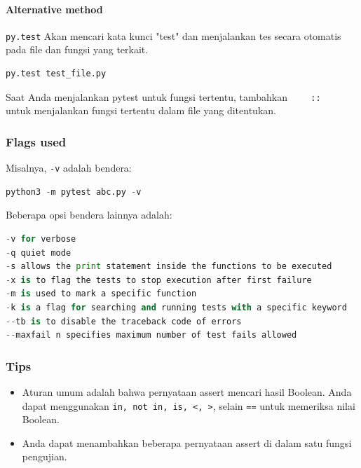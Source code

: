 \documentclass{article}
\begin{document}
\paragraph{Alternative method}

\verb|py.test| Akan mencari kata kunci "test" dan menjalankan tes secara otomatis pada file dan fungsi yang terkait.
\begin{lstlisting}[language=Python, caption={}, captionpos=b]
    py.test test_file.py
\end{lstlisting}

Saat Anda menjalankan pytest untuk fungsi tertentu, tambahkan \verb|    ::   | untuk menjalankan fungsi tertentu dalam file yang ditentukan.

\subsubsection{Flags used}
Misalnya, \verb|-v| adalah bendera:
\begin{lstlisting}[language=Python, caption={}, captionpos=b]
    python3 -m pytest abc.py -v
\end{lstlisting}

Beberapa opsi bendera lainnya adalah:
\begin{lstlisting}[language=Python, caption={}, captionpos=b]
-v for verbose
-q quiet mode
-s allows the print statement inside the functions to be executed
-x is to flag the tests to stop execution after first failure
-m is used to mark a specific function
-k is a flag for searching and running tests with a specific keyword
--tb is to disable the traceback code of errors
--maxfail n specifies maximum number of test fails allowed
\end{lstlisting}

\subsubsection{Tips}
\begin{itemize}
    \item Aturan umum adalah bahwa pernyataan assert mencari hasil Boolean. Anda dapat menggunakan \verb|in, not in, is, <, >|, selain \verb|==| untuk memeriksa nilai Boolean.
    \item Anda dapat menambahkan beberapa pernyataan assert di dalam satu fungsi pengujian.
\end{itemize}
\end{document}
